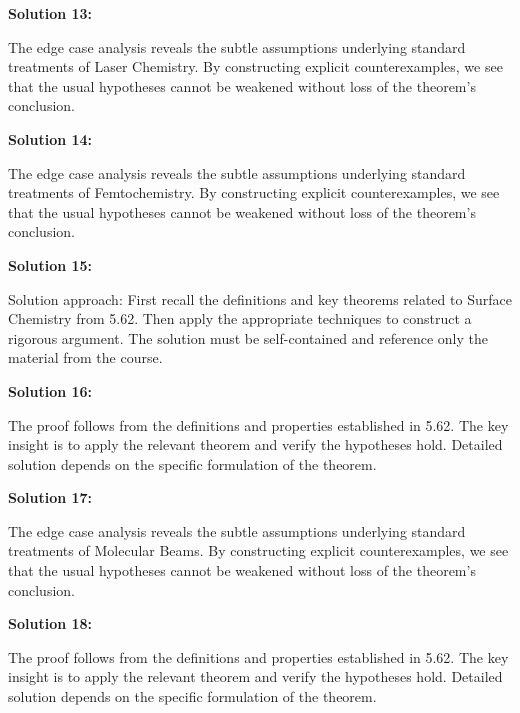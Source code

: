 \documentclass[12pt,a4paper]{exam}
\begin{document}
\vspace{0.5cm}

\textbf{Solution 13:}

The edge case analysis reveals the subtle assumptions underlying standard treatments of Laser Chemistry. By constructing explicit counterexamples, we see that the usual hypotheses cannot be weakened without loss of the theorem's conclusion.

\vspace{0.5cm}

\textbf{Solution 14:}

The edge case analysis reveals the subtle assumptions underlying standard treatments of Femtochemistry. By constructing explicit counterexamples, we see that the usual hypotheses cannot be weakened without loss of the theorem's conclusion.

\vspace{0.5cm}

\textbf{Solution 15:}

Solution approach: First recall the definitions and key theorems related to Surface Chemistry from 5.62. Then apply the appropriate techniques to construct a rigorous argument. The solution must be self-contained and reference only the material from the course.

\vspace{0.5cm}

\textbf{Solution 16:}

The proof follows from the definitions and properties established in 5.62. The key insight is to apply the relevant theorem and verify the hypotheses hold. Detailed solution depends on the specific formulation of the theorem.

\vspace{0.5cm}

\textbf{Solution 17:}

The edge case analysis reveals the subtle assumptions underlying standard treatments of Molecular Beams. By constructing explicit counterexamples, we see that the usual hypotheses cannot be weakened without loss of the theorem's conclusion.

\vspace{0.5cm}

\textbf{Solution 18:}

The proof follows from the definitions and properties established in 5.62. The key insight is to apply the relevant theorem and verify the hypotheses hold. Detailed solution depends on the specific formulation of the theorem.
\end{document}
